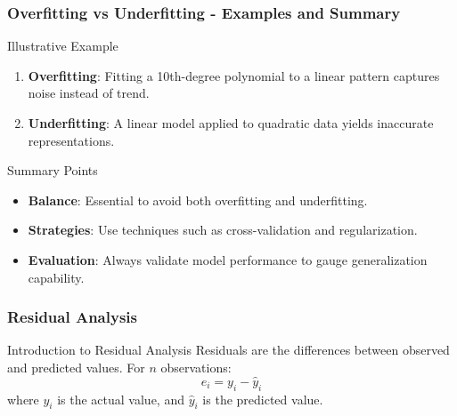 \documentclass[aspectratio=169]{beamer}
\begin{document}
\begin{frame}[fragile]
    \frametitle{Overfitting vs Underfitting - Examples and Summary}
    \begin{block}{Illustrative Example}
        \begin{enumerate}
            \item \textbf{Overfitting}: 
                Fitting a 10th-degree polynomial to a linear pattern captures noise instead of trend.
            \item \textbf{Underfitting}: 
                A linear model applied to quadratic data yields inaccurate representations.
        \end{enumerate}
    \end{block}
    
    \begin{block}{Summary Points}
        \begin{itemize}
            \item \textbf{Balance}: Essential to avoid both overfitting and underfitting.
            \item \textbf{Strategies}: Use techniques such as cross-validation and regularization.
            \item \textbf{Evaluation}: Always validate model performance to gauge generalization capability.
        \end{itemize}
    \end{block}
\end{frame}

\begin{frame}[fragile]
    \frametitle{Residual Analysis}
    \begin{block}{Introduction to Residual Analysis}
        Residuals are the differences between observed and predicted values. For \( n \) observations:
        \[
        e_i = y_i - \hat{y}_i
        \]
        where \( y_i \) is the actual value, and \( \hat{y}_i \) is the predicted value.
    \end{block}
\end{frame}
\end{document}
